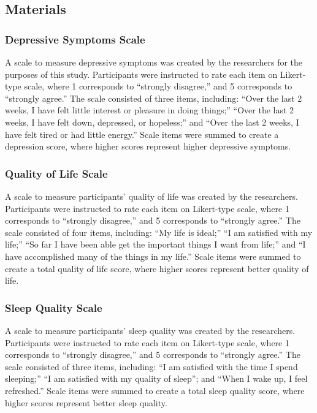 \documentclass[man, noextraspace]{apa6}
\theoremstyle{definition}
\theoremstyle{definition}
\theoremstyle{definition}
\theoremstyle{remark}
\begin{document}
\subsection{Materials}\label{materials}

\subsubsection{Depressive Symptoms
Scale}\label{depressive-symptoms-scale}

A scale to measure depressive symptoms was created by the researchers
for the purposes of this study. Participants were instructed to rate
each item on Likert-type scale, where 1 corresponds to \enquote{strongly
disagree,} and 5 corresponds to \enquote{strongly agree.} The scale
consisted of three items, including: \enquote{Over the last 2 weeks, I
have felt little interest or pleasure in doing things;} \enquote{Over
the last 2 weeks, I have felt down, depressed, or hopeless;} and
\enquote{Over the last 2 weeks, I have felt tired or had little energy.}
Scale items were summed to create a depression score, where higher
scores represent higher depressive symptoms.

\subsubsection{Quality of Life Scale}\label{quality-of-life-scale}

A scale to measure participants' quality of life was created by the
researchers. Participants were instructed to rate each item on
Likert-type scale, where 1 corresponds to \enquote{strongly disagree,}
and 5 corresponds to \enquote{strongly agree.} The scale consisted of
four items, including: \enquote{My life is ideal;} \enquote{I am
satisfied with my life;} \enquote{So far I have been able get the
important things I want from life;} and \enquote{I have accomplished
many of the things in my life.} Scale items were summed to create a
total quality of life score, where higher scores represent better
quality of life.

\subsubsection{Sleep Quality Scale}\label{sleep-quality-scale}

A scale to measure participants' sleep quality was created by the
researchers. Participants were instructed to rate each item on
Likert-type scale, where 1 corresponds to \enquote{strongly disagree,}
and 5 corresponds to \enquote{strongly agree.} The scale consisted of
three items, including: \enquote{I am satisfied with the time I spend
sleeping;} \enquote{I am satisfied with my quality of sleep}; and
\enquote{When I wake up, I feel refreshed.} Scale items were summed to
create a total sleep quality score, where higher scores represent better
sleep quality.
\end{document}
